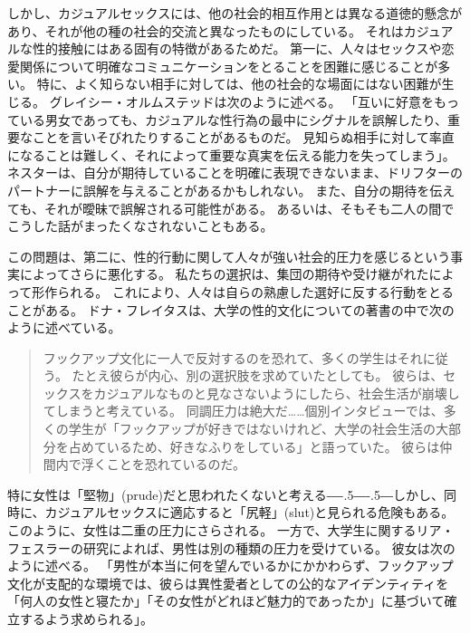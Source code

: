 \documentclass[paper=a4,book,openany]{jlreq}
\def\DDASH{―\kern-.5\zw―\kern-.5\zw―} %
\begin{document}
しかし、カジュアルセックスには、他の社会的相互作用とは異なる道徳的懸念があり、それが他の種の社会的交流と異なったものにしている。
それはカジュアルな性的接触にはある固有の特徴があるためだ。
第一に、人々はセックスや恋愛関係について明確なコミュニケーションをとることを困難に感じることが多い。
特に、よく知らない相手に対しては、他の社会的な場面にはない困難が生じる。
グレイシー・オルムステッドは次のように述べる。
「互いに好意をもっている男女であっても、カジュアルな性行為の最中にシグナルを誤解したり、重要なことを言いそびれたりすることがあるものだ。
見知らぬ相手に対して率直になることは難しく、それによって重要な真実を伝える能力を失ってしまう」\citep{olmstead18:_divor_sex_love}。
ネスターは、自分が期待していることを明確に表現できないまま、ドリフターのパートナーに誤解を与えることがあるかもしれない。
また、自分の期待を伝えても、それが曖昧で誤解される可能性がある。
あるいは、そもそも二人の間でこうした話がまったくなされないこともある。

この問題は、第二に、性的行動に関して人々が強い社会的圧力を感じるという事実によってさらに悪化する。
私たちの選択は、集団の期待や受け継がれたによって形作られる。
これにより、人々は自らの熟慮した選好に反する行動をとることがある。
ドナ・フレイタスは、大学の性的文化についての著書の中で次のように述べている。

\begin{quote}
  フックアップ文化に一人で反対するのを恐れて、多くの学生はそれに従う。
たとえ彼らが内心、別の選択肢を求めていたとしても。
彼らは、セックスをカジュアルなものと見なさないようにしたら、社会生活が崩壊してしまうと考えている。
同調圧力は絶大だ……個別インタビューでは、多くの学生が「フックアップが好きではないけれど、大学の社会生活の大部分を占めているため、好きなふりをしている」と語っていた。
彼らは仲間内で浮くことを恐れているのだ。
\citep{freitas13:_time_stop_hook_up}

\end{quote}

特に女性は「堅物」(prude)だと思われたくないと考える{\DDASH}しかし、同時に、カジュアルセックスに適応すると「尻軽」(slut)と見られる危険もある。
このように、女性は二重の圧力にさらされる。
一方で、大学生に関するリア・フェスラーの研究によれば、男性は別の種類の圧力を受けている。
彼女は次のように述べる。
「男性が本当に何を望んでいるかにかかわらず、フックアップ文化が支配的な環境では、彼らは異性愛者としての公的なアイデンティティを「何人の女性と寝たか」「その女性がどれほど魅力的であったか」に基づいて確立するよう求められる」\citep{fessler16:_lot_women_dont}。
\end{document}
